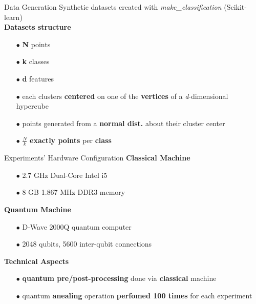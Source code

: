		\begin{frame}{Data Generation}
			Synthetic datasets created with \textit{make\_classification} (Scikit-learn)	\\
			\textbf{Datasets structure}
			\begin{itemize}
				\item[$\bullet$] \textbf{N} points	
				\item[$\bullet$] \textbf{k} classes	
				\item[$\bullet$] \textbf{d} features 
				\item[$\bullet$] each clusters \textbf{centered} on one of the \textbf{vertices} of a \textit{d}-dimensional hypercube  
				\item[$\bullet$] points generated from a \textbf{normal dist.} about their cluster center 
				\item[$\bullet$] $\frac{N}{k}$ \textbf{exactly points} per \textbf{class}   
			\end{itemize}

			
		\end{frame}

		\begin{frame}{Experiments' Hardware Configuration}	
			\textbf{Classical Machine}
			\begin{itemize}
				\item[$\bullet$] 2.7 GHz Dual-Core Intel i5 
				\item[$\bullet$] 8 GB 1.867 MHz DDR3 memory 
			\end{itemize}

			\textbf{Quantum Machine}
			\begin{itemize}
				\item[$\bullet$] D-Wave 2000Q quantum computer 
				\item[$\bullet$] 2048 qubits, 5600 inter-qubit connections
			\end{itemize}

			\textbf{Technical Aspects}
			\begin{itemize}
				\item[$\bullet$] \textbf{quantum pre/post-processing} done via \textbf{classical} machine
				\item[$\bullet$] quantum \textbf{anealing} operation \textbf{perfomed 100 times} for each experiment   
			\end{itemize}			


		\end{frame}

